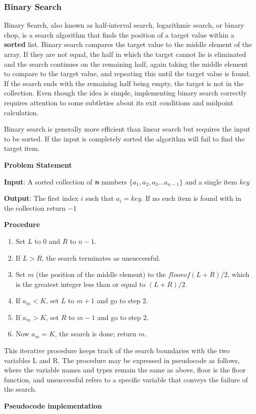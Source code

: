 \documentclass[12pt,a4paper]{book}
\begin{document}
\subsubsection{Binary Search}
\par Binary Search, also known as half-interval search, logarithmic search, or binary chop, is a search algorithm that finds the position of a target value within a \textbf{sorted} list. Binary search compares the target value to the middle element of the array. If they are not equal, the half in which the target cannot lie is eliminated and the search continues on the remaining half, again taking the middle element to compare to the target value, and repeating this until the target value is found. If the search ends with the remaining half being empty, the target is not in the collection. Even though the idea is simple, implementing binary search correctly requires attention to some subtleties about its exit conditions and midpoint calculation.
\par Binary search is generally more efficient than linear search but requires the input to be sorted. If the input is completely sorted the algorithm will fail to find the target item.\par
\noindent \textbf {Problem Statement} \par
\textbf{Input}: A sorted collection of \textbf{\textit{n}} numbers $\{a_{1} , a_{2} , a_{3} ... a_{n-1} \}$ and a single item $key$\par
\textbf{Output}: The first index $i$ such that  $a_{i} = key$. If no such item is found with in the collection return $-1$
\par
\noindent \textbf {Procedure} \par
\begin{enumerate}
\item Set $L$ to $0$ and $R$ to $n − 1$.
\item If $L > R$, the search terminates as unsuccessful.
\item Set $m$ (the position of the middle element) to the $floor of (L + R) / 2$, which is the greatest integer less than or equal to $(L + R) / 2$.
\item If $a_{m} < K$, set $L$ to $m + 1$ and go to step 2.
\item If $a_{m} > K$, set $R$ to $m − 1$ and go to step 2.
\item Now $a_{m} = K$, the search is done; return $m$.
\end{enumerate}
\par 
This iterative procedure keeps track of the search boundaries with the two variables L and R. The procedure may be expressed in pseudocode as follows, where the variable names and types remain the same as above, floor is the floor function, and unsuccessful refers to a specific variable that conveys the failure of the search.\par
\noindent \textbf {Pseudocode implementation}

\end{document}
